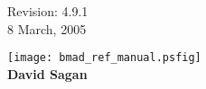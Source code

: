 \thispagestyle{empty}

\begin{flushright}
\large
  Revision: 4.9.1 \\
  8 March, 2005 \\
\end{flushright}

\vfill

{
\begin{center}
\texttt{[image: bmad\_ref\_manual.psfig]} \\
\vskip 0.3in
\huge\bf David Sagan
\end{center}
}

\vfill
\break
